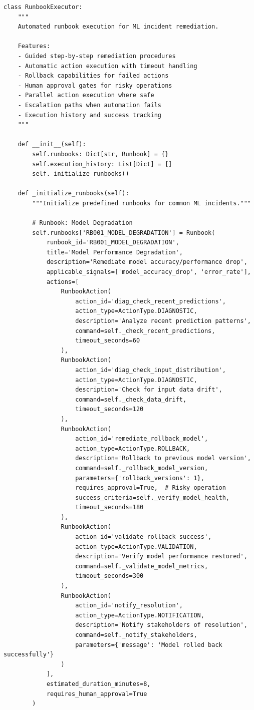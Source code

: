 \begin{lstlisting}[style=python, caption={Runbook automation with guided remediation}]
class RunbookExecutor:
    """
    Automated runbook execution for ML incident remediation.

    Features:
    - Guided step-by-step remediation procedures
    - Automatic action execution with timeout handling
    - Rollback capabilities for failed actions
    - Human approval gates for risky operations
    - Parallel action execution where safe
    - Escalation paths when automation fails
    - Execution history and success tracking
    """

    def __init__(self):
        self.runbooks: Dict[str, Runbook] = {}
        self.execution_history: List[Dict] = []
        self._initialize_runbooks()

    def _initialize_runbooks(self):
        """Initialize predefined runbooks for common ML incidents."""

        # Runbook: Model Degradation
        self.runbooks['RB001_MODEL_DEGRADATION'] = Runbook(
            runbook_id='RB001_MODEL_DEGRADATION',
            title='Model Performance Degradation',
            description='Remediate model accuracy/performance drop',
            applicable_signals=['model_accuracy_drop', 'error_rate'],
            actions=[
                RunbookAction(
                    action_id='diag_check_recent_predictions',
                    action_type=ActionType.DIAGNOSTIC,
                    description='Analyze recent prediction patterns',
                    command=self._check_recent_predictions,
                    timeout_seconds=60
                ),
                RunbookAction(
                    action_id='diag_check_input_distribution',
                    action_type=ActionType.DIAGNOSTIC,
                    description='Check for input data drift',
                    command=self._check_data_drift,
                    timeout_seconds=120
                ),
                RunbookAction(
                    action_id='remediate_rollback_model',
                    action_type=ActionType.ROLLBACK,
                    description='Rollback to previous model version',
                    command=self._rollback_model_version,
                    parameters={'rollback_versions': 1},
                    requires_approval=True,  # Risky operation
                    success_criteria=self._verify_model_health,
                    timeout_seconds=180
                ),
                RunbookAction(
                    action_id='validate_rollback_success',
                    action_type=ActionType.VALIDATION,
                    description='Verify model performance restored',
                    command=self._validate_model_metrics,
                    timeout_seconds=300
                ),
                RunbookAction(
                    action_id='notify_resolution',
                    action_type=ActionType.NOTIFICATION,
                    description='Notify stakeholders of resolution',
                    command=self._notify_stakeholders,
                    parameters={'message': 'Model rolled back successfully'}
                )
            ],
            estimated_duration_minutes=8,
            requires_human_approval=True
        )


\end{lstlisting}
